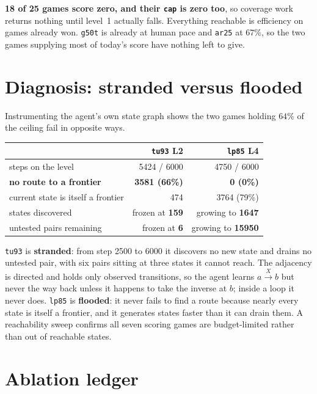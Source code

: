 \documentclass[11pt,a4paper]{article}
\begin{document}
\textbf{18 of 25 games score zero, and their \texttt{cap} is zero too}, so coverage work
returns nothing until level~1 actually falls. Everything reachable is efficiency on games
already won. \texttt{g50t} is already at human pace and \texttt{ar25} at $67\%$, so the
two games supplying most of today's score have nothing left to give.

\section{Diagnosis: stranded versus flooded}

Instrumenting the agent's own state graph shows the two games holding $64\%$ of the
ceiling fail in opposite ways.

\begin{center}
\begin{tabular}{lrr}
\toprule
& \texttt{tu93} L2 & \texttt{lp85} L4 \\
\midrule
steps on the level & 5424 / 6000 & 4750 / 6000 \\
\textbf{no route to a frontier} & \textbf{3581 (66\%)} & \textbf{0 (0\%)} \\
current state is itself a frontier & 474 & 3764 (79\%) \\
states discovered & frozen at \textbf{159} & growing to \textbf{1647} \\
untested pairs remaining & frozen at \textbf{6} & growing to \textbf{15950} \\
\bottomrule
\end{tabular}
\end{center}

\texttt{tu93} is \textbf{stranded}: from step 2500 to 6000 it discovers no new state and
drains no untested pair, with six pairs sitting at three states it cannot reach. The
adjacency is directed and holds only observed transitions, so the agent learns
$a \xrightarrow{X} b$ but never the way back unless it happens to take the inverse at
$b$; inside a loop it never does. \texttt{lp85} is \textbf{flooded}: it never fails to
find a route because nearly every state is itself a frontier, and it generates states
faster than it can drain them. A reachability sweep confirms all seven scoring games are
budget-limited rather than out of reachable states.

\section{Ablation ledger}
\end{document}
